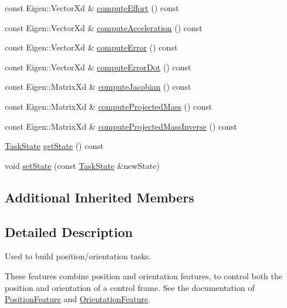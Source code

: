 \begin{DoxyCompactItemize}
\item 
const Eigen\+::\+Vector\+Xd \& \hyperlink{classocra_1_1DisplacementFeature_aee1c2f5af98c28e8d6ab3dbeb5c3c297}{compute\+Effort} () const
\item 
const Eigen\+::\+Vector\+Xd \& \hyperlink{classocra_1_1DisplacementFeature_a1f2fa6644359c3897ac8d3e4e06c5f81}{compute\+Acceleration} () const
\item 
const Eigen\+::\+Vector\+Xd \& \hyperlink{classocra_1_1DisplacementFeature_ac0520f1a870558227ba6d5339a243414}{compute\+Error} () const
\item 
const Eigen\+::\+Vector\+Xd \& \hyperlink{classocra_1_1DisplacementFeature_a684821d2a83945c63661eacdf4bcd262}{compute\+Error\+Dot} () const
\item 
const Eigen\+::\+Matrix\+Xd \& \hyperlink{classocra_1_1DisplacementFeature_a87e2abee5d1072e142dcab99193699da}{compute\+Jacobian} () const
\item 
const Eigen\+::\+Matrix\+Xd \& \hyperlink{classocra_1_1DisplacementFeature_a31902186d804823eea5ba0177ed85ced}{compute\+Projected\+Mass} () const
\item 
const Eigen\+::\+Matrix\+Xd \& \hyperlink{classocra_1_1DisplacementFeature_a3639d72ab7b85ac4b9533ed6498c0c03}{compute\+Projected\+Mass\+Inverse} () const
\item 
\hyperlink{classocra_1_1TaskState}{Task\+State} \hyperlink{classocra_1_1DisplacementFeature_a3940d5c27ee1845c65f4be6ad3a27e50}{get\+State} () const
\item 
void \hyperlink{classocra_1_1DisplacementFeature_a7a99c7e57d512ec2d6094fc10388e033}{set\+State} (const \hyperlink{classocra_1_1TaskState}{Task\+State} \&new\+State)
\end{DoxyCompactItemize}
\subsection*{Additional Inherited Members}


\subsection{Detailed Description}
Used to build position/orientation tasks. 

These features combine position and orientation features, to control both the position and orientation of a control frame. See the documentation of \hyperlink{classocra_1_1PositionFeature}{Position\+Feature} and \hyperlink{classocra_1_1OrientationFeature}{Orientation\+Feature}. 

